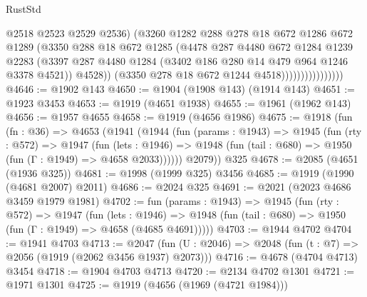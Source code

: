 \begin{lexlean}{RustStd}
\begin{coremodule}
                                  @2518
                                  @2523
                                  @2529
                                  @2536)
                                (@3260
                                  @1282
                                  @288
                                  @278
                                  @18
                                  @672
                                  @1286
                                  @672
                                  @1289
                                  (@3350
                                    @288
                                    @18
                                    @672
                                    @1285
                                    (@4478
                                      @287
                                      @4480
                                      @672
                                      @1284
                                      @1239
                                      @2283
                                      (@3397
                                        @287
                                        @4480
                                        @1284
                                        (@3402 @186 @280 @14 @479 @964 @1246 @3378 @4521))
                                      @4528))
                                  (@3350 @278 @18 @672 @1244 @4518))))))))))))))))
@4646 := @1902 @143
@4650 := @1904 (@1908 @143) (@1914 @143)
@4651 := @1923 @3453
@4653 := @1919 (@4651 @1938)
@4655 := @1961 (@1962 @143)
@4656 := @1957 @4655
@4658 := @1919 (@4656 @1986)
@4675 := @1918
    (fun (fn : @36) =>
    @4653
      (@1941
        (@1944
          (fun (params : @1943) =>
          @1945
            (fun (rty : @572) =>
            @1947
              (fun (lets : @1946) =>
              @1948 (fun (tail : @680) => @1950 (fun (Γ : @1949) => @4658 @2033))))))
        @2079))
    @325
@4678 := @2085 (@4651 (@1936 @325))
@4681 := @1998 (@1999 @325) @3456
@4685 := @1919 (@1990 (@4681 @2007) @2011)
@4686 := @2024 @325
@4691 := @2021 (@2023 @4686 @3459 @1979 @1981)
@4702 := fun (params : @1943) =>
  @1945
    (fun (rty : @572) =>
    @1947
      (fun (lets : @1946) =>
      @1948 (fun (tail : @680) => @1950 (fun (Γ : @1949) => @4658 (@4685 @4691)))))
@4703 := @1944 @4702
@4704 := @1941 @4703
@4713 := @2047 (fun (U : @2046) => @2048 (fun (t : @7) => @2056 (@1919 (@2062 @3456 @1937) @2073)))
@4716 := @4678 (@4704 @4713) @3454
@4718 := @1904 @4703 @4713
@4720 := @2134 @4702 @1301
@4721 := @1971 @1301
@4725 := @1919 (@4656 (@1969 (@4721 @1984)))

\end{coremodule}
\end{lexlean}
